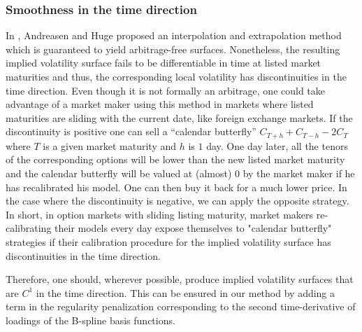 \documentclass[a4paper]{article}
\newcommand{\1}{\textbf{1}}
\begin{document}
\subsubsection*{Smoothness in the time direction}
\par In \cite{JesperVolInterpolation}, Andreasen and Huge proposed an interpolation and extrapolation method which is guaranteed to yield arbitrage-free surfaces. Nonetheless, the resulting implied volatility surface fails to be differentiable in time at listed market maturities and thus, the corresponding local volatility has discontinuities in the time direction. Even though it is not formally an arbitrage, one could take advantage of a market maker using this method in markets where listed maturities are sliding with the current date, like foreign exchange markets. If the discontinuity is positive one can sell a ``calendar butterfly'' $C_{T+h} + C_{T - h} - 2 C_T$ where $T$ is a given market maturity and $h$ is $1$ day. One day later, all the tenors of the corresponding options will be lower than the new listed market maturity and the calendar butterfly will be valued at (almost) $0$ by the market maker if he has recalibrated his model. One can then buy it back for a much lower price. In the case where the discontinuity is negative, we can apply the opposite strategy. In short, in option markets with sliding listing maturity, market makers re-calibrating their models every day expose themselves to "calendar butterfly" strategies if their calibration procedure for the implied volatility surface has discontinuities in the time direction. 
\par Therefore, one should, wherever possible, produce implied volatility surfaces that are $C^1$ in the time direction. This can be ensured in our method by adding a term in the regularity penalization corresponding to the second time-derivative of loadings of the B-spline basis functions.
\end{document}
